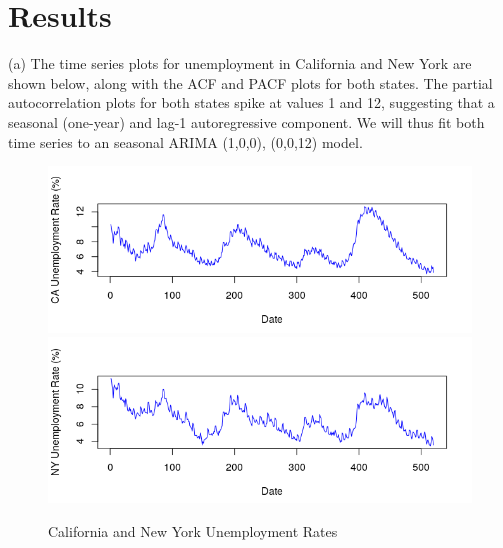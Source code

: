 \documentclass{article}
\begin{document}
\section{Results}
(a) The time series plots for unemployment in California and New York are shown below, along with the ACF and PACF plots for both states. The partial autocorrelation plots for both states spike at values 1 and 12, suggesting that a seasonal (one-year) and lag-1 autoregressive component. We will thus fit both time series to an seasonal ARIMA (1,0,0), (0,0,12) model.
\begin{figure}[H]

	\includegraphics[width=\linewidth]{ca_ts}
		\includegraphics[width=\linewidth]{ny_ts}
			\caption{California and New York Unemployment Rates} 
\end{figure}
\end{document}
